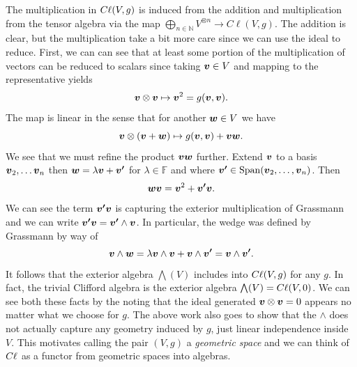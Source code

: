 \documentclass{article}
\begin{document}
The multiplication in $C\ell(V,g)$ is induced from the addition and multiplication from the tensor algebra via the map $\bigoplus_{n\in \mathbb{N}} V^{\otimes n} \to C\ell(V,g)$. The addition is clear, but the multiplication take a bit more care since we can use the ideal to reduce. First, we can can see that at least some portion of the multiplication of vectors can be reduced to scalars since taking $\boldsymbol{v}\in V$ and mapping to the representative yields
\begin{equation}
    \boldsymbol{v}\otimes \boldsymbol{v} \mapsto \boldsymbol{v}^2 = g(\boldsymbol{v},\boldsymbol{v}).
\end{equation}
The map is linear in the sense that for another $\boldsymbol{w}\in V$ we have
\begin{equation}
    \boldsymbol{v} \otimes (\boldsymbol{v}+\boldsymbol{w}) \mapsto g(\boldsymbol{v},\boldsymbol{v}) + \boldsymbol{v}\boldsymbol{w}.
\end{equation}
We see that we must refine the product $\boldsymbol{v}\boldsymbol{w}$ further. Extend $\boldsymbol{v}$ to a basis $\boldsymbol{v}_2,\dots \boldsymbol{v}_n$ then $\boldsymbol{w}=\lambda \boldsymbol{v}+\boldsymbol{v'}$ for $\lambda \in \mathbb{F}$ and where $\boldsymbol{v'} \in \mathrm{Span}(\boldsymbol{v}_2,\dots,\boldsymbol{v}_n)$. Then
\begin{equation}
    \boldsymbol{w}\boldsymbol{v}=\boldsymbol{v}^2 + \boldsymbol{v'}\boldsymbol{v}.
\end{equation}
We can see the term $\boldsymbol{v'}\boldsymbol{v}$ is capturing the exterior multiplication of Grassmann and we can write $\boldsymbol{v'}\boldsymbol{v} = \boldsymbol{v'}\wedge \boldsymbol{v}$. In particular, the wedge was defined by Grassmann by way of
\begin{equation}
    \boldsymbol{v} \wedge \boldsymbol{w} = \lambda \boldsymbol{v}\wedge \boldsymbol{v} + \boldsymbol{v}\wedge \boldsymbol{v'} = \boldsymbol{v}\wedge \boldsymbol{v'}.
\end{equation}
It follows that the exterior algebra $\bigwedge (V)$ includes into $C\ell(V,g)$ for any $g$. In fact, the trivial Clifford algebra is the exterior algebra $\bigwedge(V) = C\ell(V,0)$. We can see both these facts by the noting that the ideal generated $\boldsymbol{v}\otimes \boldsymbol{v}=0$ appears no matter what we choose for $g$. The above work also goes to show that the $\wedge$ does not actually capture any geometry induced by $g$, just linear independence inside $V$. This motivates calling the pair $(V,g)$ a \emph{geometric space} and we can think of $C\ell$ as a functor from geometric spaces into algebras.
\end{document}
